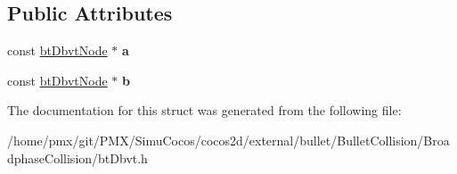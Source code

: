 \subsection*{Public Attributes}
\begin{DoxyCompactItemize}
\item 
\mbox{\label{structbtDbvt_1_1sStkNN_a19aac3b49e31298384a86a18bf298480}} 
const \hyperlink{structbtDbvtNode}{bt\+Dbvt\+Node} $\ast$ {\bfseries a}
\item 
\mbox{\label{structbtDbvt_1_1sStkNN_aada93fa9b9a180c9950096410612f6c4}} 
const \hyperlink{structbtDbvtNode}{bt\+Dbvt\+Node} $\ast$ {\bfseries b}
\end{DoxyCompactItemize}


The documentation for this struct was generated from the following file\+:\begin{DoxyCompactItemize}
\item 
/home/pmx/git/\+P\+M\+X/\+Simu\+Cocos/cocos2d/external/bullet/\+Bullet\+Collision/\+Broadphase\+Collision/bt\+Dbvt.\+h\end{DoxyCompactItemize}
